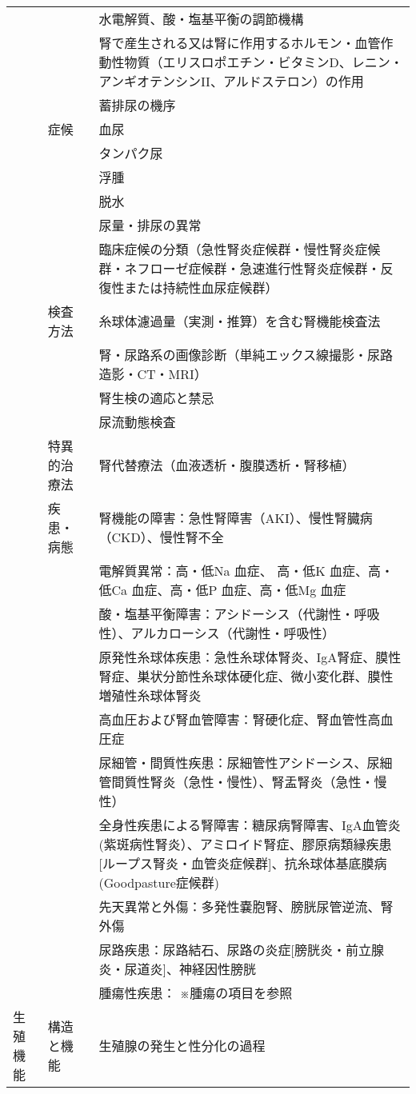 \begin{xltabular}{\linewidth}{XXX}
 &  & 水電解質、酸・塩基平衡の調節機構 \\
 &  & 腎で産生される又は腎に作用するホルモン・血管作動性物質（エリスロポエチン・ビタミンD、レニン・アンギオテンシンII、アルドステロン）の作用 \\
 &  & 蓄排尿の機序 \\
 & 症候 & 血尿 \\
 &  & タンパク尿 \\
 &  & 浮腫 \\
 &  & 脱水 \\
 &  & 尿量・排尿の異常 \\
 &  & 臨床症候の分類（急性腎炎症候群・慢性腎炎症候群・ネフローゼ症候群・急速進行性腎炎症候群・反復性または持続性血尿症候群） \\
 & 検査方法 & 糸球体濾過量（実測・推算）を含む腎機能検査法 \\
 &  & 腎・尿路系の画像診断（単純エックス線撮影・尿路造影・CT・MRI） \\
 &  & 腎生検の適応と禁忌 \\
 &  & 尿流動態検査 \\
 & 特異的治療法 & 腎代替療法（血液透析・腹膜透析・腎移植） \\
 & 疾患・病態 & 腎機能の障害：急性腎障害（AKI）、慢性腎臓病（CKD）、慢性腎不全 \\
 &  & 電解質異常：高・低Na 血症、 高・低K 血症、高・低Ca 血症、高・低P 血症、高・低Mg 血症 \\
 &  & 酸・塩基平衡障害：アシドーシス（代謝性・呼吸性）、アルカローシス（代謝性・呼吸性） \\
 &  & 原発性糸球体疾患：急性糸球体腎炎、IgA腎症、膜性腎症、巣状分節性糸球体硬化症、微小変化群、膜性増殖性糸球体腎炎 \\
 &  & 高血圧および腎血管障害：腎硬化症、腎血管性高血圧症 \\
 &  & 尿細管・間質性疾患：尿細管性アシドーシス、尿細管間質性腎炎（急性・慢性）、腎盂腎炎（急性・慢性） \\
 &  & 全身性疾患による腎障害：糖尿病腎障害、IgA血管炎(紫斑病性腎炎）、アミロイド腎症、膠原病類縁疾患[ループス腎炎・血管炎症候群]、抗糸球体基底膜病(Goodpasture症候群) \\
 &  & 先天異常と外傷：多発性嚢胞腎、膀胱尿管逆流、腎外傷 \\
 &  & 尿路疾患：尿路結石、尿路の炎症[膀胱炎・前立腺炎・尿道炎]、神経因性膀胱 \\
 &  & 腫瘍性疾患： ※腫瘍の項目を参照 \\
生殖機能 & 構造と機能 & 生殖腺の発生と性分化の過程 \\

\end{xltabular}
